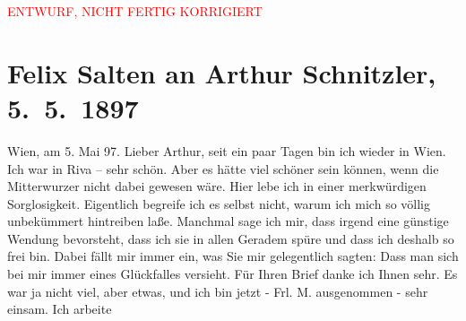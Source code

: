 
\begin{center}
            \textcolor{red}{ENTWURF, NICHT FERTIG KORRIGIERT}
                      \end{center}
            
         
         \renewcommand{\erwaehntePersonen}{Personen: Richard Beer-Hofmann, Otto Brahm, Julius von Gans-Ludassy, Georg Hirschfeld, Hugo von Hofmannsthal, Wilhelmine Mitterwurzer, Ottilie Salten, Gustav Schwarzkopf}
         \renewcommand{\erwaehnteOrte}{Orte: Riva del Garda, Wien}
         \renewcommand{\erwaehnteWerke}{Werke: Agnes Jordan. Schauspiel in fünf Akten}
               \section[Felix Salten an Arthur Schnitzler, 5. 5. 1897]{ Felix Salten an Arthur Schnitzler, 5. 5. 1897}\nopagebreak{}\rehead{ }\begin{ledgroupsized}[t]{13cm}\normalsize\beginnumbering \toendnotes[C]{\smallbreak\pagebreak[2]} 
\toendnotes[C]{\smallbreak}\pstart
           \raggedleft{}{\pb} Wien, am 5. Mai 97. \pend
           \pstart
           Lieber Arthur, seit ein paar Tagen bin ich wieder in Wien. Ich war in Riva – sehr schön. Aber es hätte viel schöner sein können, wenn die Mitterwurzer nicht dabei gewesen wäre. Hier
               lebe ich in einer merkwürdigen Sorglosigkeit. Eigentlich begreife ich es selbst
               nicht, warum ich mich so völlig unbekümmert hintreiben laße. Manchmal sage ich mir,
               dass irgend eine günstige Wendung bevorsteht, dass ich sie in allen Geradem spüre und
               dass ich deshalb so frei bin. Dabei fällt mir immer ein, was Sie mir gelegentlich
               sagten: Dass man sich bei mir immer eines Glückfalles versieht. Für Ihren Brief danke
               ich Ihnen sehr. Es war ja nicht viel, aber etwas, und ich bin jetzt - Frl. M. ausgenommen - sehr einsam. Ich arbeite

\end{ledgroupsized}
